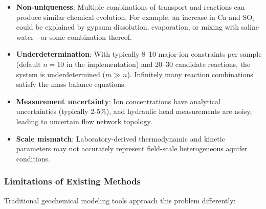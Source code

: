 \documentclass[12pt,a4paper]{article}
\theoremstyle{plain}
\theoremstyle{definition}
\theoremstyle{remark}
\begin{document}
\begin{itemize}
	\item \textbf{Non-uniqueness}: Multiple combinations of transport and reactions can produce similar chemical evolution. For example, an increase in Ca and SO$_4$ could be explained by gypsum dissolution, evaporation, or mixing with saline water---or some combination thereof.
	\item \textbf{Underdetermination}: With typically 8--10 major-ion constraints per sample (default $n=10$ in the implementation) and 20--30 candidate reactions, the system is underdetermined ($m \gg n$). Infinitely many reaction combinations satisfy the mass balance equations.
	\item \textbf{Measurement uncertainty}: Ion concentrations have analytical uncertainties (typically 2-5\%), and hydraulic head measurements are noisy, leading to uncertain flow network topology.
	\item \textbf{Scale mismatch}: Laboratory-derived thermodynamic and kinetic parameters may not accurately represent field-scale heterogeneous aquifer conditions.
\end{itemize}

\subsubsection{Limitations of Existing Methods}

Traditional geochemical modeling tools approach this problem differently:
\end{document}
